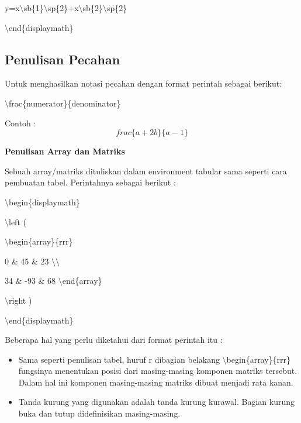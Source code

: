 y=x$\setminus$sb\{1\}$\setminus$sp\{2\}+x$\setminus$sb\{2\}$\setminus$sp\{2\}
\par \vspace{12pt}
$\setminus$end\{displaymath\}
\par \vspace{12pt}


\subsection {Penulisan Pecahan}
\par \vspace{12pt}
Untuk menghasilkan notasi pecahan dengan format perintah sebagai berikut:\par \vspace{12pt}

$\setminus$frac\{numerator\}\{denominator\}
\par \vspace{12pt}
Contoh :
\begin{equation}
frac\{a+2b\}\{a-1\}
\end{equation}


\textbf{Penulisan Array dan Matriks}
\par \vspace{12pt}
Sebuah array/matriks dituliskan dalam environment tabular sama seperti cara pembuatan tabel. Perintahnya sebagai berikut :
\par \vspace{12pt}
$\setminus$begin\{displaymath\}
\par \vspace{12pt}
$\setminus$left (
\par \vspace{12pt}
$\setminus$begin\{array\}\{rrr\}
\par \vspace{12pt}
0 \& 45 \& 23 $\setminus$$\setminus$
\par \vspace{12pt}
34 \& -93 \& 68 $\setminus$end\{array\}
\par \vspace{12pt}
$\setminus$right )
\par \vspace{12pt}
$\setminus$end\{displaymath\}
\par \vspace{12pt}


Beberapa hal yang perlu diketahui dari format perintah itu :

\begin{itemize}
\item Sama seperti penulisan tabel, huruf r dibagian belakang 
$\setminus$begin\{array\}\{rrr\} fungsinya menentukan posisi dari masing-masing komponen matriks tersebut. Dalam hal ini komponen masing-masing matriks dibuat menjadi rata kanan.
\item Tanda kurung yang digunakan adalah tanda kurung kurawal. Bagian kurung buka dan tutup didefinisikan masing-masing.
\end{itemize}


